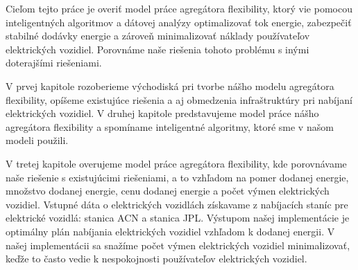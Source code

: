 
Cieľom tejto práce je overiť model práce agregátora flexibility, ktorý vie pomocou inteligentných algoritmov a dátovej analýzy optimalizovať tok energie, zabezpečiť stabilné dodávky energie a zároveň minimalizovať náklady používateľov elektrických vozidiel. Porovnáme naše riešenia tohoto problému s inými doterajšími riešeniami. \cite{lee2021acnsim}



V prvej kapitole rozoberieme východiská pri tvorbe nášho modelu agregátora flexibility, opíšeme existujúce riešenia a aj obmedzenia infraštruktúry pri nabíjaní elektrických vozidiel. V druhej kapitole predstavujeme model práce nášho agregátora flexibility a spomíname inteligentné algoritmy, ktoré sme v našom modeli použili. 


V tretej kapitole overujeme model práce agregátora flexibility, kde porovnávame naše riešenie s existujúcimi riešeniami, a to vzhľadom na pomer dodanej energie, množstvo dodanej energie, cenu dodanej energie a počet výmen elektrických vozidiel. Vstupné dáta o elektrických vozidlách získavame z nabíjacích staníc pre elektrické vozidlá: stanica ACN a stanica JPL. Výstupom našej implementácie je optimálny plán nabíjania elektrických vozidiel vzhľadom k dodanej energii. V našej implementácii sa snažíme počet výmen elektrických vozidiel minimalizovať, keďže to často vedie k nespokojnosti používateľov elektrických vozidiel. 





